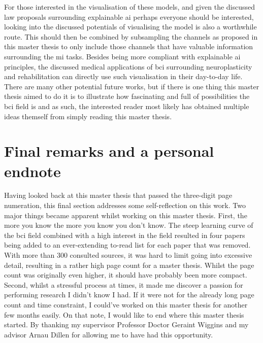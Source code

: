 For those interested in the visualisation of these models, and given the discussed law proposals surrounding explainable \gls{ai} perhaps everyone should be interested, looking into the discussed potentials of visualising the model is also a worthwhile route.
This should then be combined by subsampling the channels as proposed in this master thesis to only include those channels that have valuable information surrounding the \gls{mi} tasks.
Besides being more compliant with explainable \gls{ai} principles, the discussed medical applications of \gls{bci} surrounding neuroplasticity and rehabilitation can directly use such visualisation in their day-to-day life.
There are many other potential future works, but if there is one thing this master thesis aimed to do it is to illustrate how fascinating and full of possibilities the \gls{bci} field is and as such, the interested reader most likely has obtained multiple ideas themself from simply reading this master thesis.


\section{Final remarks and a personal endnote}
\label{sec:discussion_final_remarks}

Having looked back at this master thesis that passed the three-digit page numeration, this final section addresses some self-reflection on this work.
Two major things became apparent whilst working on this master thesis.
First, the more you know the more you know you don't know.
The steep learning curve of the \gls{bci} field combined with a high interest in the field resulted in four papers being added to an ever-extending to-read list for each paper that was removed.
With more than 300 consulted sources, it was hard to limit going into excessive detail, resulting in a rather high page count for a master thesis.
Whilst the page count was originally even higher, it should have probably been more compact.
Second, whilst a stressful process at times, it made me discover a passion for performing research I didn't know I had.
If it were not for the already long page count and time constraint, I could've worked on this master thesis for another few months easily.
On that note, I would like to end where this master thesis started.
By thanking my supervisor Professor Doctor Geraint Wiggins and my advisor Arnau Dillen for allowing me to have had this opportunity.